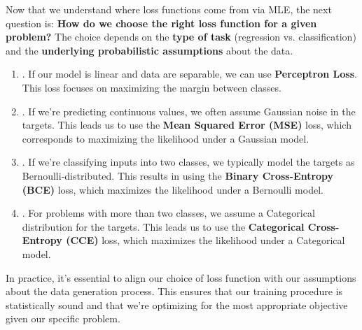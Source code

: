\begin{deepeningbox}
    Now that we understand where loss functions come from via MLE, the next question is: \textbf{How do we choose the right loss function for a given problem?} The choice depends on the \textbf{type of task} (regression vs. classification) and the \textbf{underlying probabilistic assumptions} about the data.
    \begin{enumerate}
        \item {}. If our model is linear and data are separable, we can use \textbf{Perceptron Loss}. This loss focuses on maximizing the margin between classes.

        \item {}. If we're predicting continuous values, we often assume Gaussian noise in the targets. This leads us to use the \textbf{Mean Squared Error (MSE)} loss, which corresponds to maximizing the likelihood under a Gaussian model.

        \item {}. If we're classifying inputs into two classes, we typically model the targets as Bernoulli-distributed. This results in using the \textbf{Binary Cross-Entropy (BCE)} loss, which maximizes the likelihood under a Bernoulli model.

        \item {}. For problems with more than two classes, we assume a Categorical distribution for the targets. This leads us to use the \textbf{Categorical Cross-Entropy (CCE)} loss, which maximizes the likelihood under a Categorical model.
    \end{enumerate}
    In practice, it's essential to align our choice of loss function with our assumptions about the data generation process. This ensures that our training procedure is statistically sound and that we're optimizing for the most appropriate objective given our specific problem.
\end{deepeningbox}